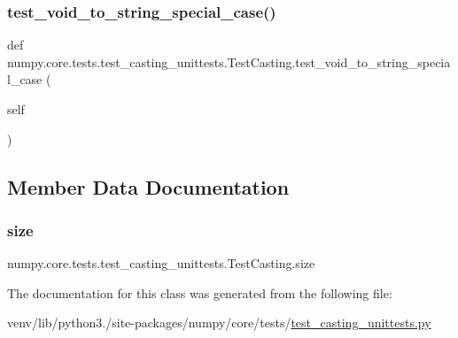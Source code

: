 \subsubsection{\texorpdfstring{test\+\_\+void\+\_\+to\+\_\+string\+\_\+special\+\_\+case()}{test\_void\_to\_string\_special\_case()}}
{\footnotesize\ttfamily def numpy.\+core.\+tests.\+test\+\_\+casting\+\_\+unittests.\+Test\+Casting.\+test\+\_\+void\+\_\+to\+\_\+string\+\_\+special\+\_\+case (\begin{DoxyParamCaption}\item[{}]{self }\end{DoxyParamCaption})}



\subsection{Member Data Documentation}
\mbox{\label{classnumpy_1_1core_1_1tests_1_1test__casting__unittests_1_1TestCasting_adced26039605445c098224b08e631993}} 
\subsubsection{\texorpdfstring{size}{size}}
{\footnotesize\ttfamily numpy.\+core.\+tests.\+test\+\_\+casting\+\_\+unittests.\+Test\+Casting.\+size\hspace{0.3cm}{\ttfamily [static]}}



The documentation for this class was generated from the following file\+:\begin{DoxyCompactItemize}
\item 
venv/lib/python3./site-\/packages/numpy/core/tests/\hyperlink{test__casting__unittests_8py}{test\+\_\+casting\+\_\+unittests.\+py}\end{DoxyCompactItemize}
